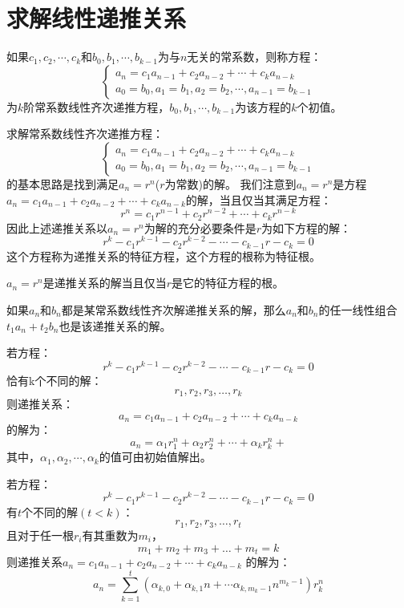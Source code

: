 \documentclass[cyan]{elegantnote}
\begin{document}
\section{求解线性递推关系}
\begin{newdef}[常系数线性齐次递推方程]
   如果$c_1,c_2,\cdots,c_k$和$b_0,b_1,\cdots,b_{k-1}$为与$n$无关的常系数，则称方程：
   \[
      \left\{
         \begin{aligned}
            a_n=c_1a_{n-1}+c_2a_{n-2}+\cdots+c_ka_{n-k}\\
            a_0=b_0,a_1=b_1,a_2=b_2,\cdots,a_{n-1}=b_{k-1}
         \end{aligned}
      \right.
   \]
   为$k$阶常系数线性齐次递推方程，$b_0,b_1,\cdots,b_{k-1}$为该方程的$k$个初值。
\end{newdef}
\begin{newdef}[递推关系特征方程与特征根]
   求解常系数线性齐次递推方程：
   \[
      \left\{
         \begin{aligned}
            a_n=c_1a_{n-1}+c_2a_{n-2}+\cdots+c_ka_{n-k}\\
            a_0=b_0,a_1=b_1,a_2=b_2,\cdots,a_{n-1}=b_{k-1}
         \end{aligned}
      \right.
   \]
   的基本思路是找到满足$a_n=r^n$($r$为常数)的解。
   我们注意到$a_n=r^n$是方程$a_n=c_1a_{n-1}+c_2a_{n-2}+\cdots+c_ka_{n-k}$的解，当且仅当其满足方程：
   \[r^n=c_1r^{n-1}+c_2r^{n-2}+\cdots+c_kr^{n-k}\]
   因此上述递推关系以$a_n=r^n$为解的充分必要条件是$r$为如下方程的解：
   \[r^k-c_1r^{k-1}-c_2r^{k-2}-\cdots-c_{k-1}r-c_k=0\]
   这个方程称为递推关系的特征方程，这个方程的根称为特征根。
\end{newdef}
\begin{newthem}
   $a_n=r^n$是递推关系的解当且仅当$r$是它的特征方程的根。
\end{newthem}
\begin{newthem}
   如果$a_n$和$b_n$都是某常系数线性齐次解递推关系的解，那么$a_n$和$b_n$的任一线性组合$t_1a_n+t_2b_n$也是该递推关系的解。
\end{newthem}
\begin{newthem}
   若方程：
   \[r^k-c_1r^{k-1}-c_2r^{k-2}-\cdots-c_{k-1}r-c_k=0\]
   恰有k个不同的解：
   \[r_1,r_2,r_3,\dots,r_k\]
   则递推关系：
   \[a_n=c_1a_{n-1}+c_2a_{n-2}+\cdots+c_ka_{n-k}\]
   的解为：
   \[a_n=\alpha_1r_1^n+\alpha_2r_2^n+\cdots+\alpha_kr_k^n+\]
   其中，$\alpha_1,\alpha_2,\cdots,\alpha_k$的值可由初始值解出。
\end{newthem}
\begin{newthem}
   若方程：
   \[r^k-c_1r^{k-1}-c_2r^{k-2}-\cdots-c_{k-1}r-c_k=0\]
   有$t$个不同的解$(t<k)$：
   \[r_1,r_2,r_3,\dots,r_t\]
   且对于任一根$r_i$有其重数为$m_i$，
   \[m_1+m_2+m_3+\dots+m_t=k\]
   则递推关系$a_n=c_1a_{n-1}+c_2a_{n-2}+\cdots+c_ka_{n-k}$
   的解为：
   \[
      a_n=\sum_{k=1}^t(\alpha_{k,0}+\alpha_{k,1}n+\cdots\alpha_{k,m_k-1}n^{m_k-1})r_k^n
   \]

\end{newthem}
\end{document}
